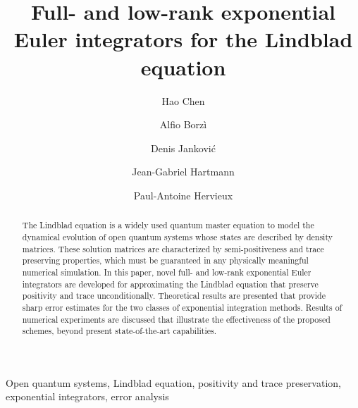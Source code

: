 \documentclass[preprint,3p,compress,12pt]{elsarticle}
\numberwithin{equation}{section}
\numberwithin{figure}{section}
\begin{document}
\begin{frontmatter}

\title{\textbf{Full- and low-rank exponential Euler integrators for the Lindblad equation}}
\author[1]{Hao Chen}
\author[2]{Alfio Borz\`{i}}
\author[3]{Denis Jankovi\'{c}}
\author[3]{Jean-Gabriel Hartmann}
\author[3]{Paul-Antoine Hervieux}

\address[1]{College of Mathematics Science, Chongqing Normal University, Chongqing, China.}
\address[2]{Institut f\"{u}r Mathematik,
Universit\"{a}t W\"{u}rzburg, W\"{u}rzburg, Germany.}
\address[3]{Institut de Physique et Chimie des Mat\'{e}riaux de Strasbourg (IPCMS), Universit\'{e} de Strasbourg, Strasbourg, France.}

\begin{abstract}
The Lindblad equation is a widely used quantum master equation to model the dynamical evolution of open quantum systems whose states are described by density matrices. These solution matrices are characterized
by semi-positiveness and trace preserving properties, which must be guaranteed
in any physically meaningful numerical simulation.
In this paper, novel full- and low-rank exponential Euler integrators are developed for approximating the Lindblad equation that preserve positivity and trace unconditionally.
Theoretical results are presented that provide sharp error estimates for
the two classes of exponential integration methods.
Results of numerical experiments are discussed that illustrate the
effectiveness of the proposed schemes, beyond present state-of-the-art
capabilities.
\end{abstract}
\begin{keyword}
{Open quantum systems, Lindblad equation, positivity and trace preservation, exponential integrators, error analysis}
\end{keyword}

\end{frontmatter}
\end{document}
